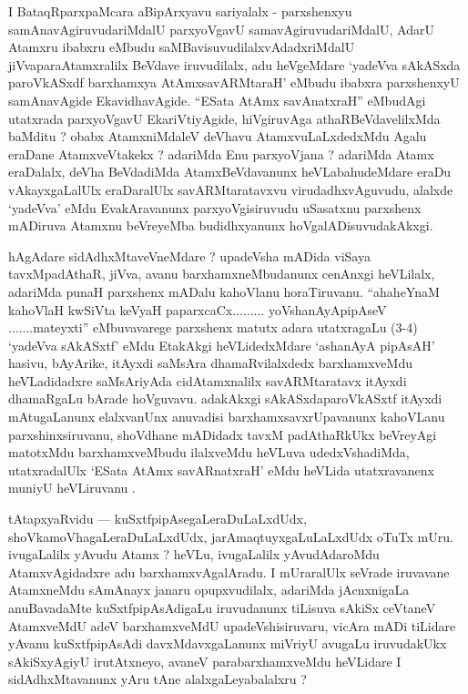 \begin{artha}
I BataqRparxpaMcara aBipArxyavu sariyalalx - parxshenxyu samAnavAgiruvuda\-riMdalU parxyoVgavU samavAgiruvudariMdalU, AdarU Atamxru ibabxru eMbudu saMBavisuvudilalxvAdadxriMdalU jiVvaparaAtamxralilx BeVdave iruvudilalx, adu heVgeMdare `yadeVva sAkASxda paroVkASxdf barxhamxya AtAmxsavARMtaraH' eMbudu ibabxra parxshenxyU samAnavAgide EkavidhavAgide. ``ESata AtAmx savAnatxraH'' eMbudAgi utatxrada parxyoVgavU EkariVtiyAgide, hiVgiruvAga athaRBeVdavelilxMda baMditu ? obabx AtamxniMdaleV deVhavu AtamxvuLaLxdedxMdu Agalu eraDane AtamxveVtakekx ? adariMda Enu parxyoVjana ? adariMda Atamx eraDalalx, deVha BeVdadiMda AtamxBeVdavanunx heVLabahudeMdare eraDu vAkayxgaLalUlx eraDaralUlx savARMtaratavxvu virudadhxvAguvudu, alalxde `yadeVva' eMdu EvakAravanunx parxyoVgisiruvudu uSasatxnu parxshenx mADiruva Atamxnu beVreyeMba budidhxyanunx hoVgalADisuvudakAkxgi.
\end{artha}


\begin{artha}
hAgAdare sidAdhxMtaveVneMdare ? upadeVsha mADida viSaya tavxMpadAthaR, jiVva, avanu barxhamxneMbudanunx cenAnxgi heVLilalx, adariMda punaH parxshenx mADalu kahoVlanu horaTiruvanu. ``ahaheYnaM kahoVlaH kwSiVta keVyaH paparxcaCx......... yoV\s shanAyApipAseV .......mateyxti'' eMbuvavarege parxshenx matutx adara utatxragaLu (3-4) `yadeVva sAkASxtf' eMdu EtakAkgi heVLidedxMdare `ashanAyA pipAsAH' hasivu, bAyArike, itAyxdi saMsAra dhamaRvilalxdedx barxhamxveMdu heVLadidadxre saMsAriyAda cidAtamxnalilx savARMtaratavx itAyxdi dhamaRgaLu bArade hoVguvavu. adakAkxgi sAkASxdaparoVkASxtf itAyxdi mAtugaLanunx elalxvanUnx anuvadisi barxhamxsavxrUpavanunx kahoVLanu parxshinxsiruvanu, shoVdhane mADidadx tavxM padAthaRkUkx beVreyAgi matotxMdu barxhamxveMbudu ilalxveMdu heVLuva udedxVshadiMda, utatxradalUlx `ESata AtAmx savARnatxraH' eMdu heVLida utatxravanenx muniyU heVLiruvanu .
\end{artha}

\begin{artha}
tAtapxyaRvidu --- kuSxtfpipAsegaLeraDuLaLxdUdx, shoVkamoVhagaLeraDuLaLxdUdx, jarAmaqtuyxgaLuLaLxdUdx oTuTx mUru. ivugaLalilx yAvudu Atamx ? heVLu, ivugaLalilx yAvudAdaroMdu AtamxvAgidadxre adu barxhamxvAgalAradu. I mUraralUlx seVrade iruvavane AtamxneMdu sAmAnayx janaru opupxvudilalx, adariMda jAcnxnigaLa anuBavadaMte kuSxtfpipAsAdigaLu iruvudanunx tiLisuva sAkiSx ceVtaneV AtamxveMdU adeV barxhamxveMdU upadeVshisiruvaru, vicAra mADi tiLidare yAvanu kuSxtf\-pipAsAdi davxMdavxgaLanunx miVriyU avugaLu iruvudakUkx sAkiSxyAgiyU iru\-tAtxneyo, avaneV parabarxhamxveMdu heVLidare I sidAdhxMtavanunx yAru tAne alalx\-gaLeyabalalxru ?
\end{artha}

